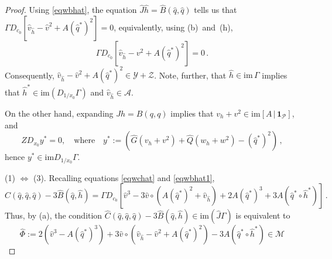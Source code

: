 \documentclass[11pt]{amsart}
\newcommand{\wQ}{\widehat{Q}}
\newcommand{\wG}{\widehat{G}}
\newcommand{\wB}{\widehat{B}}
\newcommand{\wC}{\widehat{C}}
\newcommand{\wJ}{\hat{J}}
\newcommand{\mA}{\mathcal{A}}
\newcommand{\mP}{\mathcal{P}}
\newcommand{\mM}{\mathcal{M}}
\newcommand{\mY}{\mathcal{Y}}
\newcommand{\mZ}{\mathcal{Z}}
\theoremstyle{definition}
\begin{document}
\begin{proof}
Using \eqref{eqwbhat}, the equation $\wJ \hat{h} = \wB(\hat{q},\hat{q})$ tells us that $\Gamma D_{c_0}[\hat{v}_{\hat{h}} - \hat{v}^2 + A(\hat{q}^*)^2] = 0$, equivalently, using (b)~and~(h),
\begin{equation}
\label{eqcstar1}
\Gamma D_{c_0}[\hat{v}_{\hat{h}} - v^2 + A(\hat{q}^*)^2] = 0\,.
\end{equation}
Consequently, $\hat{v}_{\hat{h}} - \hat{v}^2 + A(\hat{q}^*)^2 \in \mY + \mZ$. Note, further, that $\hat{h} \in \mathrm{im}\,\Gamma$ implies that $\hat{h}^* \in \mathrm{im}(D_{1/x_0}\Gamma)$ and $\hat{v}_{\hat{h}} \in \mA$. 

On the other hand, expanding $Jh = B(q,q)$ implies that $v_h+v^2 \in \mathrm{im}[A\,|\,\bm{1}_\mP]$, and 
\begin{equation}
\label{eqcstar2}
ZD_{x_0}y^* = 0, \quad \mbox{where} \quad y^*:=(\wG (v_h+v^2) + \wQ (w_h+w^2) - (\hat{q}^*)^2)\,,
\end{equation}
hence $y^* \in \mathrm{im}D_{1/x_0}\Gamma$.  

(1) $\Leftrightarrow$ (3). Recalling equations \eqref{eqwchat} and \eqref{eqwbhat1}, 
\[
\wC(\hat{q}, \hat{q}, \hat{q}) - 3 \wB(\hat{q}, \hat{h}) = \Gamma D_{c_0}\left[\hat{v}^3 - 3\hat{v}\circ (A (\hat{q}^*)^2 + \hat{v}_{\hat{h}}) + 2A(\hat{q}^*)^3  +3A(\hat{q}^*\circ \hat{h}^*)\right]\,.
\]
Thus, by (a), the condition $\wC(\hat{q}, \hat{q}, \hat{q}) - 3 \wB(\hat{q}, \hat{h}) \in \mathrm{im}(\wJ\Gamma)$ is equivalent to
\[
\widehat{\Phi}:= 2(\hat{v}^3 - A(\hat{q}^*)^3) + 3\hat{v}\circ (\hat{v}_{\hat{h}} - \hat{v}^2+A (\hat{q}^*)^2) -3A(\hat{q}^*\circ \hat{h}^*) \in \mM
\]



\end{proof}
\end{document}
